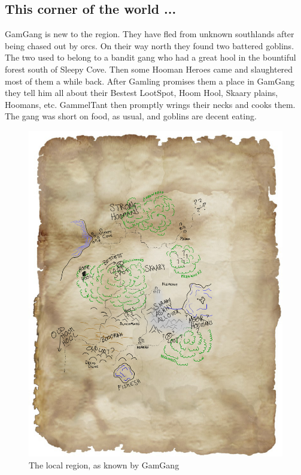 \subsection*{This corner of the world ...}

GamGang is new to the region. They have fled from unknown southlands after being chased out by orcs. On their way north they found two battered goblins. The two used to belong to a bandit gang who had a great hool in the bountiful forest south of Sleepy Cove. Then some Hooman Heroes came and slaughtered most of them a while back. After Gamling promises them a place in GamGang they tell him all about their Bestest LootSpot, Hoom Hool, Skaary plains, Hoomans, etc. GammelTant then promptly wrings their necks and cooks them. The gang was short on food, as usual, and goblins are decent eating.

\begin{figure}[h!]
  \centering
  \includegraphics[width=1.0\textwidth]{fig/region.jpg}
  \caption*{The local region, as known by GamGang}
\end{figure}

